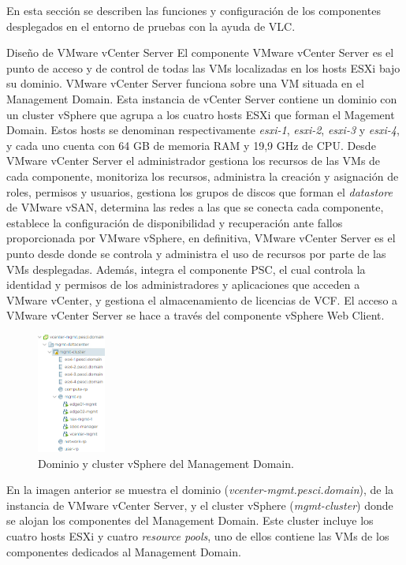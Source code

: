 En esta sección se describen las funciones y configuración de los componentes desplegados en el entorno de pruebas con la ayuda de VLC. 

\begin{subsubsection}{Diseño de VMware vCenter Server}
El componente VMware vCenter Server es el punto de acceso y de control de todas las VMs localizadas en los hosts ESXi bajo su dominio. VMware vCenter Server funciona sobre una VM situada en el Management Domain. Esta instancia de vCenter Server contiene un dominio con un cluster vSphere que agrupa a los cuatro hosts ESXi que forman el Magement Domain. Estos hosts se denominan respectivamente \textit{esxi-1}, \textit{esxi-2}, \textit{esxi-3} y \textit{esxi-4}, y cada uno cuenta con 64 GB de memoria RAM y 19,9 GHz de CPU. Desde VMware vCenter Server el administrador gestiona los recursos de las VMs de cada componente, monitoriza los recursos, administra la creación y asignación de roles, permisos y usuarios, gestiona los grupos de discos que forman el \textit{datastore} de VMware vSAN, determina las redes a las que se conecta cada componente, establece la configuración de disponibilidad y recuperación ante fallos proporcionada por VMware vSphere, en definitiva, VMware vCenter Server es el punto desde donde se controla y administra el uso de recursos por parte de las VMs desplegadas. Además, integra el componente PSC, el cual controla la identidad y permisos de los administradores y aplicaciones que acceden a VMware vCenter, y gestiona el almacenamiento de licencias de VCF. El acceso a VMware vCenter Server se hace a través del componente vSphere Web Client.
\begin{figure}[h]
  \centering
  \includegraphics[width=0.2\textwidth]{imaxes/pruebaconcepto/clusterVCenterServer.png}
  \caption{Dominio y cluster vSphere del Management Domain.}
  \label{fig:cluster-vCenter-Server}
\end{figure}
\FloatBarrier
En la imagen anterior se muestra el dominio (\textit{vcenter-mgmt.pesci.domain}), de la instancia de VMware vCenter Server, y el cluster vSphere (\textit{mgmt-cluster}) donde se alojan los componentes del Management Domain. Este cluster incluye los cuatro hosts ESXi y cuatro \textit{resource pools}, uno de ellos contiene las VMs de los componentes dedicados al Management Domain.

\end{subsubsection}
